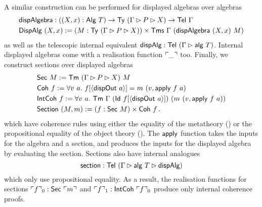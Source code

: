 A similar construction can be performed for displayed algebras over algebras
\begin{align*}
&\textsf{dispAlgebra} : ((X, x) : \textsf{Alg}\ T) \to \textsf{Ty}\ (\Gamma \rhd P \rhd X) \to \textsf{Tel}\ \Gamma \\
&\textsf{DispAlg}\ (X, x) := (M : \textsf{Ty}\ (\Gamma \rhd P \rhd X)) \times \textsf{Tms}\ \Gamma\ (\textsf{dispAlgebra}\ (X, x)\ M)
\end{align*}
as well as the telescopic internal equivalent $\mta{dispAlg} : \Tel\ (\Gamma \rhd \mta{alg}\ T)$. %
Internal displayed algebras come with a realisation function $\ulcorner \_ \urcorner$ too.
Finally, we construct sections over displayed algebras
\begin{align*}
     &\mta{Sec}\ M := \Tm\ (\Gamma \rhd P \rhd X)\ M \\
     &\mta{Coh}\ f := \forall v\ a.\ f[\Msub{\mta{dispOut}\ a}] = m\ (v, \mta{apply}\ f\ a) \\
     &\mta{IntCoh}\ f := \forall v\ a.\ \Tm\ \Gamma\ (\mta{Id}\ f[\Msub{\mta{dispOut}\ a}])\ (m\ (v, \mta{apply}\ f\ a)) \\
     &\mta{Section}\ (M, m) := (f : \mta{Sec}\ M) \times \mta{Coh}\ f  \,.
\end{align*}
which have coherence rules using either the equality of the metatheory () or
the propositional equality of the object theory ().
The $\textsf{apply}$ function takes the inputs for the algebra and a section,
and produces the inputs for the displayed algebra by evaluating the section.
Sections also have internal analogues
\[
    \textsf{section} : \textsf{Tel}\ (\Gamma \rhd \textsf{alg}\ T \rhd \textsf{dispAlg})
\]
which only use propositional equality.
As a result, the realisation functions for sections $\ulcorner f \urcorner_0 : \textsf{Sec}\
\ulcorner m \urcorner$ and $\emb{f}_1 : \mta{IntCoh}\ \emb{f}_0$ produce only internal
coherence proofs.


